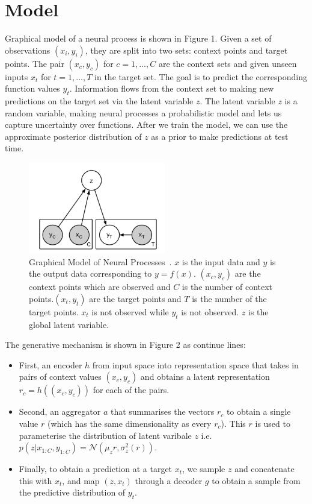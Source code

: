\documentclass{article}
\begin{document}
\section{Model}
Graphical model of a neural process is shown in Figure 1. Given a set of observations $(x_i,y_i)$, they are split into two sets: context points and target points.  The pair $(x_{c},y_{c})$ for $c = 1,...,C$ are the context sets and given unseen inputs $x_{t}$ for $t = 1,..., T$ in the target set. The goal is to predict the corresponding function values $y_{t}$. Information flows from the context set to making new predictions on the target set via the latent variable $z$. The latent variable $z$ is a random variable, making neural processes a probabilistic model and lets us capture uncertainty over functions. After we train the model, we can use the approximate posterior distribution of $z$ as a prior to make predictions at test time.  

\begin{figure}[h!]
  \centering
  \includegraphics[width = 6cm]{graphicalmodel_NP.png}
  \caption{Graphical Model of Neural Processes~\cite{garnelo2018neural}. $x$ is the input data and $y$ is the output data corresponding to $y = f(x)$. $(x_{c},y_{c})$ are the context points which are observed and $C$ is the number of context points.$(x_{t},y_{t})$  are the target points and $T$  is the number of the target points. $x_{t}$ is not observed while $y_{t}$ is not observed. $z$ is the global latent variable.}
\end{figure}

The generative mechanism is shown in Figure 2 as continue lines: 
\begin{itemize}

\item First, an encoder $h$ from input space into representation space that takes in pairs of context values $(x_{c}, y_{c})$ and obtains a latent representation $r_{c} = h((x_{c}, y_{c}))$ for each of the pairs.

\item Second, an aggregator $a$ that summarises the vectors $r_c$ to obtain a single value $r$ (which has the same dimensionality as every $r_c$). This $r$ is used to parameterise the distribution of latent varibale $z$ i.e. $p(z|x_{1:C},y_{1:C}) = \mathcal{N}(\mu_z{r},\sigma_{z}^{2}(r))$. 

\item Finally, to obtain a prediction at a target $x_{t}$, we sample $z$ and concatenate this with $x_{t}$, and map $(z,x_{t})$ through a decoder $g$ to obtain a sample from the predictive distribution of $y_{t}$. 

\end{itemize}
\end{document}
